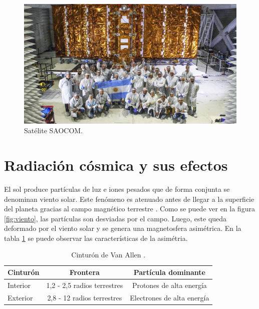 \begin{figure}[htbp]
	\centering
	\includegraphics[width=\textwidth]{./Figures/invapsaocom.jpg}
	\caption{Satélite SAOCOM\protect\footnotemark.}
	\label{fig:saocom}
\end{figure}


\section{Radiación cósmica y sus efectos}
\label{sec:radiacion}

El sol produce partículas de luz e iones pesados que de forma conjunta se denominan viento solar.
Este fenómeno es atenuado antes de llegar a la superficie del planeta gracias al campo magnético terrestre \citep{WEBSITE:structure_space_radiation}.
Como se puede ver en la figura \ref{fig:viento}, las partículas son desviadas por el campo.
Luego, este queda deformado por el viento solar y se genera una magnetosfera asimétrica.
En la tabla \ref{tab:capasmagneticas} se puede observar las características de la asimétria.

\begin{table}[h]
	\centering
	\caption[Cinturón de Van Allen]{Cinturón de Van Allen \citep{WEBSITE:structure_space_radiation}.}
	\begin{tabular}{l c c}    
		\toprule
		\textbf{Cinturón} & \textbf{Frontera}           & \textbf{Partícula dominante}\\
		\midrule
		Interior          & 1,2 - 2,5 radios terrestres & Protones de alta energía\\		
		Exterior          & 2,8 - 12 radios terrestres  & Electrones de alta energía\\
		\bottomrule
		\hline
	\end{tabular}
	\label{tab:capasmagneticas}
\end{table}

